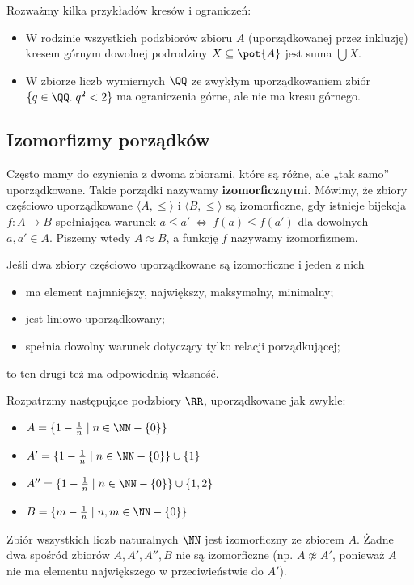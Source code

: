 \begin{example}
    Rozważmy kilka przykładów kresów i ograniczeń:
    \begin{itemize}
        \item W rodzinie wszystkich podzbiorów zbioru $A$ (uporządkowanej przez inkluzję) kresem górnym dowolnej podrodziny $X \subseteq \pot{A}$ jest suma $\bigcup X$.
        \item W zbiorze liczb wymiernych $\QQ$ ze zwykłym uporządkowaniem zbiór $\{q \in \QQ. \; q^2 < 2\}$ ma ograniczenia górne, ale nie ma kresu górnego.
    \end{itemize}
\end{example}

\subsection{Izomorfizmy porządków}
Często mamy do czynienia z dwoma zbiorami, które są różne, ale „tak samo” uporządkowane. Takie porządki nazywamy \textbf{izomorficznymi}. Mówimy, że zbiory częściowo uporządkowane $\langle A, \leq \rangle$ i $\langle B, \leq \rangle$ są izomorficzne, gdy istnieje bijekcja $f: A \rightarrow B$ spełniająca warunek $a \leq a' \ \Leftrightarrow \ f(a) \leq f(a')$ dla dowolnych $a, a' \in A$. Piszemy wtedy $A \approx B$, a funkcję $f$ nazywamy izomorfizmem.

Jeśli dwa zbiory częściowo uporządkowane są izomorficzne i jeden z nich
\begin{itemize}
    \item ma element najmniejszy, największy, maksymalny, minimalny;
    \item jest liniowo uporządkowany;
    \item spełnia dowolny warunek dotyczący tylko relacji porządkującej;
\end{itemize}
to ten drugi też ma odpowiednią własność.

\begin{example}
    Rozpatrzmy następujące podzbiory $\RR$, uporządkowane jak zwykle:
    \begin{itemize}
        \item $A = \{1 - \frac{1}{n} \; | \; n \in \NN - \{0\}\}$
        \item $A' = \{1 - \frac{1}{n} \; | \; n \in \NN - \{0\}\} \cup \{1\}$
        \item $A'' = \{1 - \frac{1}{n} \; | \; n \in \NN - \{0\}\} \cup \{1, 2\}$
        \item $B = \{m - \frac{1}{n} \; | \; n, m \in \NN - \{0\}\}$
    \end{itemize}
    Zbiór wszystkich liczb naturalnych $\NN$ jest izomorficzny ze zbiorem $A$. Żadne dwa spośród zbiorów $A, A', A'', B$ nie są izomorficzne (np. $A \napprox A'$, ponieważ $A$ nie ma elementu największego w przeciwieństwie do $A'$).
\end{example}

